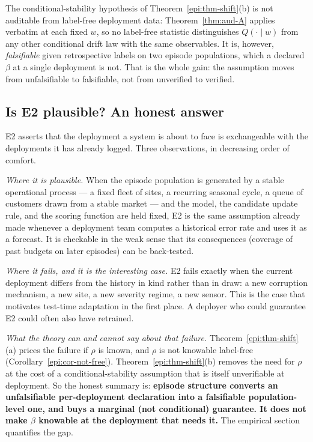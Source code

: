 \begin{corollary}\label{epi:cor-not-free}
The conditional-stability hypothesis of Theorem~\ref{epi:thm-shift}(b) is not auditable from
label-free deployment data: Theorem~\ref{thm:aud-A} applies verbatim at each fixed $w$, so no
label-free statistic distinguishes $Q(\cdot\mid w)$ from any other conditional drift law with the
same observables. It is, however, \emph{falsifiable} given retrospective labels on two episode
populations, which a declared $\beta$ at a single deployment is not. That is the whole gain:
the assumption moves from unfalsifiable to falsifiable, not from unverified to verified.
\end{corollary}

\subsection{Is E2 plausible? An honest answer}
\label{epi:sec-honesty}

E2 asserts that the deployment a system is about to face is exchangeable with the deployments it has
already logged. Three observations, in decreasing order of comfort.

\emph{Where it is plausible.} When the episode population is generated by a stable operational
process --- a fixed fleet of sites, a recurring seasonal cycle, a queue of customers drawn from a
stable market --- and the model, the candidate update rule, and the scoring function are held fixed,
E2 is the same assumption already made whenever a deployment team computes a historical error rate
and uses it as a forecast. It is checkable in the weak sense that its consequences (coverage of past
budgets on later episodes) can be back-tested.

\emph{Where it fails, and it is the interesting case.} E2 fails exactly when the current deployment
differs from the history in kind rather than in draw: a new corruption mechanism, a new site, a new
severity regime, a new sensor. This is the case that motivates test-time adaptation in the first
place. A deployer who could guarantee E2 could often also have retrained.

\emph{What the theory can and cannot say about that failure.} Theorem~\ref{epi:thm-shift}(a) prices
the failure if $\rho$ is known, and $\rho$ is not knowable label-free
(Corollary~\ref{epi:cor-not-free}). Theorem~\ref{epi:thm-shift}(b) removes the need for $\rho$ at the
cost of a conditional-stability assumption that is itself unverifiable at deployment. So the honest
summary is: \textbf{episode structure converts an unfalsifiable per-deployment declaration into a
falsifiable population-level one, and buys a marginal (not conditional) guarantee. It does not make
$\beta$ knowable at the deployment that needs it.} The empirical section quantifies the gap.

